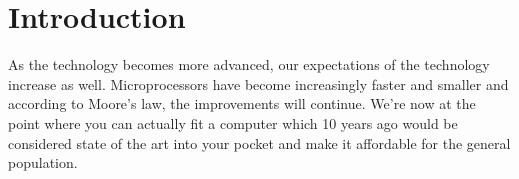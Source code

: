\chapter{Introduction}
As the technology becomes more advanced, our expectations of the technology increase as well. Microprocessors have become increasingly faster and smaller and according to Moore's law, the improvements will continue. We're now at the point where you can actually fit a computer which 10 years ago would be considered state of the art into your pocket and make it affordable for the general population.
